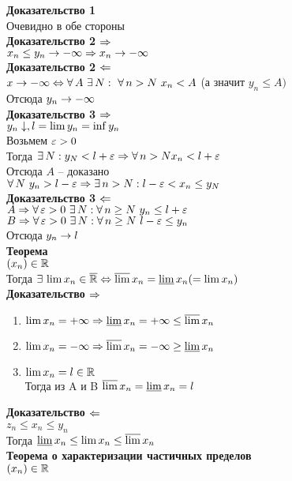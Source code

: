 \documentclass[12pt]{article}
\begin{document}
\textbf{Доказательство 1}\\
Очевидно в обе стороны\\
\textbf{Доказательство 2 $\Rightarrow$}\\
$x_n \leq y_n \rightarrow -\infty \Rightarrow x_n \rightarrow -\infty$\\
\textbf{Доказательство 2 $\Leftarrow$}\\
$x \rightarrow -\infty \Leftrightarrow \forall\, A\ \exists\, N:\ \forall\, n>N\ x_n < A$ (а значит $y_n \leq A)$\\
Отсюда $y_n \rightarrow -\infty$\\
\textbf{Доказательство 3 $\Rightarrow$}\\
$y_n \downarrow, l = \lim y_n = \inf y_n$\\
Возьмем $\varepsilon > 0$\\
Тогда $\exists\, N: y_N < l+\varepsilon \Rightarrow \forall\, n > N x_n < l+\varepsilon$\\
Отсюда $A$ -- доказано\\
$\forall\, N\ y_n > l-\varepsilon \Rightarrow \exists\, n > N: l-\varepsilon < x_n \leq y_N$\\
\textbf{Доказательство 3 $\Leftarrow$}\\
$A \Rightarrow \forall\, \varepsilon > 0\ \exists\, N: \forall\, n \geq N\ y_n \leq l+\varepsilon$\\
$B \Rightarrow \forall\, \varepsilon > 0\ \exists\, N: \forall\, n \geq N\ l - \varepsilon \leq y_n$\\
Отсюда $y_n \rightarrow l$\\
\textbf{Теорема}\\
$(x_n) \in \mathbb{R}$\\
Тогда $\exists\, \lim x_n \in \overline{\mathbb{R}} \Leftrightarrow \operatorname*{\overline{lim}} x_n = \operatorname*{\underline{lim}} x_n (= \lim x_n)$\\
\textbf{Доказательство $\Rightarrow$}
\begin{enumerate}
    \item $\lim x_n = +\infty \Rightarrow \operatorname*{\underline{lim}} x_n = +\infty \leq \operatorname*{\overline{lim}} x_n$
    \item $\lim x_n = -\infty \Rightarrow \operatorname*{\overline{lim}} x_n = -\infty \geq \operatorname*{\underline{lim}} x_n$
    \item $\lim x_n = l \in \mathbb{R}$\\
    Тогда из A и B $\operatorname*{\overline{lim}} x_n = \operatorname*{\underline{lim}} x_n = l$
\end{enumerate}
\textbf{Доказательство $\Leftarrow$}\\
$z_n \leq x_n \leq y_n$\\
Тогда $\operatorname*{\underline{lim}} x_n \leq \lim x_n \leq \operatorname*{\overline{lim}} x_n$\\
\textbf{Теорема о характеризации частичных пределов}\\
$(x_n) \in \mathbb{R}$
\end{document}
